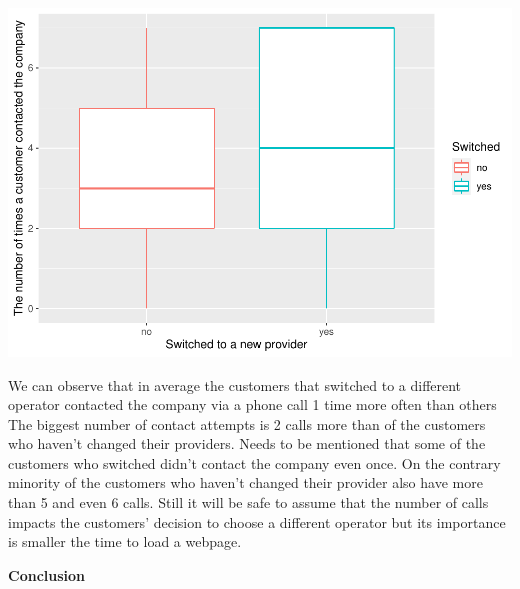 \documentclass[
]{article}
\newenvironment{Shaded}{\begin{snugshade}}{\end{snugshade}}
\newcommand{\DataTypeTok}[1]{\textcolor[rgb]{0.13,0.29,0.53}{#1}}
\newcommand{\KeywordTok}[1]{\textcolor[rgb]{0.13,0.29,0.53}{\textbf{#1}}}
\newcommand{\NormalTok}[1]{#1}
\newcommand{\OperatorTok}[1]{\textcolor[rgb]{0.81,0.36,0.00}{\textbf{#1}}}
\newcommand{\StringTok}[1]{\textcolor[rgb]{0.31,0.60,0.02}{#1}}
\begin{document}
\begin{Shaded}
\end{Shaded}

\includegraphics{Report_files/figure-latex/unnamed-chunk-5-1.pdf}

We can observe that in average the customers that switched to a
different operator contacted the company via a phone call 1 time more
often than others The biggest number of contact attempts is 2 calls more
than of the customers who haven't changed their providers. Needs to be
mentioned that some of the customers who switched didn't contact the
company even once. On the contrary minority of the customers who haven't
changed their provider also have more than 5 and even 6 calls. Still it
will be safe to assume that the number of calls impacts the customers'
decision to choose a different operator but its importance is smaller
the time to load a webpage.

\textbf{Conclusion}
\end{document}
